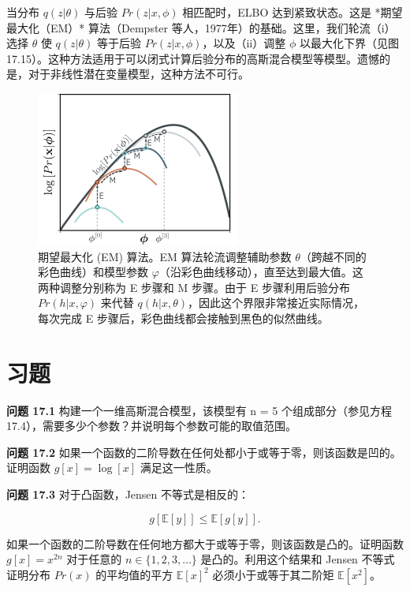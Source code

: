 当分布 \(q(z|\theta)\) 与后验 \(Pr(z|x, \phi)\) 相匹配时，ELBO 达到紧致状态。这是 *期望最大化（EM）* 算法（Dempster 等人，1977年）的基础。这里，我们轮流（i）选择 \(\theta\) 使 \(q(z|\theta)\) 等于后验 \(Pr(z|x, \phi)\)，以及（ii）调整 \(\phi\) 以最大化下界（见图 17.15）。这种方法适用于可以闭式计算后验分布的高斯混合模型等模型。遗憾的是，对于非线性潜在变量模型，这种方法不可行。

\begin{figure}[ht!]
\centering
\includegraphics[width=0.7\linewidth]{png/chapter17/VAEEMOpt.png}
\caption{期望最大化 (EM) 算法。EM 算法轮流调整辅助参数 \(\theta\)（跨越不同的彩色曲线）和模型参数 \(\varphi\)（沿彩色曲线移动），直至达到最大值。这两种调整分别称为 E 步骤和 M 步骤。由于 E 步骤利用后验分布 \(Pr(h|x, \varphi)\) 来代替 \(q(h|x, \theta)\)，因此这个界限非常接近实际情况，每次完成 E 步骤后，彩色曲线都会接触到黑色的似然曲线。}
\end{figure}

\section{习题}  
\textbf{问题 17.1} 构建一个一维高斯混合模型，该模型有 n = 5 个组成部分（参见方程 17.4），需要多少个参数？并说明每个参数可能的取值范围。

\textbf{问题 17.2} 如果一个函数的二阶导数在任何处都小于或等于零，则该函数是凹的。证明函数 \(g[x] = \log[x]\) 满足这一性质。

\textbf{问题 17.3} 对于凸函数，Jensen 不等式是相反的：

\begin{equation}
g[\mathbb{E}[y]] \leq \mathbb{E}[g[y]]. 
\end{equation}

如果一个函数的二阶导数在任何地方都大于或等于零，则该函数是凸的。证明函数 \(g[x] = x^{2n}\) 对于任意的 \(n \in \{1, 2, 3, \ldots\}\) 是凸的。利用这个结果和 Jensen 不等式证明分布 \(Pr(x)\) 的平均值的平方 \(\mathbb{E}[x]^2\) 必须小于或等于其二阶矩 \(\mathbb{E}[x^2]\)。


